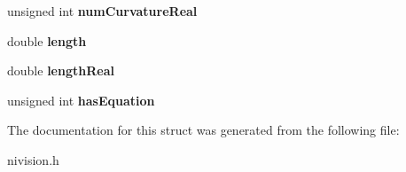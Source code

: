 \begin{DoxyCompactItemize}
\item 
\hypertarget{structContourInfoReport__struct_aee72ceab5ee75464d2e991c1471ea834}{
unsigned int {\bfseries numCurvatureReal}}
\label{structContourInfoReport__struct_aee72ceab5ee75464d2e991c1471ea834}

\item 
\hypertarget{structContourInfoReport__struct_ab36002ce8615a0c956c19b48e15324dc}{
double {\bfseries length}}
\label{structContourInfoReport__struct_ab36002ce8615a0c956c19b48e15324dc}

\item 
\hypertarget{structContourInfoReport__struct_a87515079d6b81bcaa2c1df42aea2627e}{
double {\bfseries lengthReal}}
\label{structContourInfoReport__struct_a87515079d6b81bcaa2c1df42aea2627e}

\item 
\hypertarget{structContourInfoReport__struct_ae375779cb6a0ba6462516d19978733b5}{
unsigned int {\bfseries hasEquation}}
\label{structContourInfoReport__struct_ae375779cb6a0ba6462516d19978733b5}

\end{DoxyCompactItemize}


The documentation for this struct was generated from the following file:\begin{DoxyCompactItemize}
\item 
nivision.h\end{DoxyCompactItemize}
